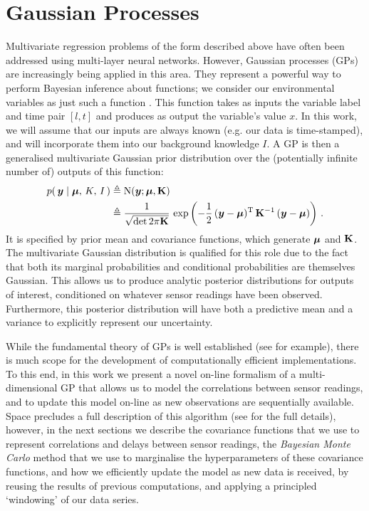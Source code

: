 \documentclass{acmtrans2m}
\begin{document}
\section{Gaussian Processes}\label{sec_gp}

\noindent Multivariate regression problems of the form described above have often been addressed using multi-layer neural networks. However, Gaussian processes (GPs) are increasingly being applied in this area. They represent a powerful way to perform Bayesian inference about functions; we consider our environmental variables as just such a function \cite{GPsBook}. This function takes as inputs the variable label and time pair $[l,t]$ and produces as output the variable's value $x$. In this work, we will assume that our inputs are always known (e.g. our data is time-stamped), and will incorporate them into our background knowledge $I$. A GP is then a generalised multivariate Gaussian prior distribution over the (potentially infinite number of) outputs of this function:
\small\begin{align}\label{eq:GPDefn}
p\!\left(\,\boldsymbol{y}\mid\boldsymbol{\mu},\,K,\,I\,\right) & \triangleq \text{N}\!\left(\boldsymbol{y};\boldsymbol{\mu},\mathbf{K}\right)\nonumber\\
& \triangleq\frac{1}{\sqrt{\det{2\pi\mathbf{K}}}}\,\exp \left(-\frac{1}{2}\,(\boldsymbol{y}-\boldsymbol{\mu})^{\mathrm{T}}\,\mathbf{K}^{-1}\,(\boldsymbol{y}-\boldsymbol{\mu})\right)\,.
\end{align}\normalsize
It is specified by prior mean and covariance functions, which generate $\boldsymbol{\mu}$ and $\mathbf{K}$.
 The multivariate Gaussian distribution is qualified for this role due to the fact that both its marginal probabilities and conditional probabilities are themselves Gaussian. This allows us to produce analytic posterior distributions for outputs of interest, conditioned on whatever sensor readings have been observed. Furthermore, this posterior distribution will have both a predictive mean and a variance to explicitly represent our uncertainty.

While the fundamental theory of GPs is well established (see  for example), there is much scope for the development of computationally efficient implementations. To this end, in this work we present a novel on-line formalism of a multi-dimensional GP that allows us to model the correlations between sensor readings, and to update this model on-line as new observations are sequentially available. Space precludes a full description of this algorithm (see \cite{gp_mike} for the full details), however, in the next sections we describe the covariance functions that we use to represent correlations and delays between sensor readings, the {\em Bayesian Monte Carlo} method that we use to marginalise the hyperparameters of these covariance functions, and how we efficiently update the model as new data is received, by reusing the results of previous computations, and applying a principled `windowing' of our data series.
\end{document}
